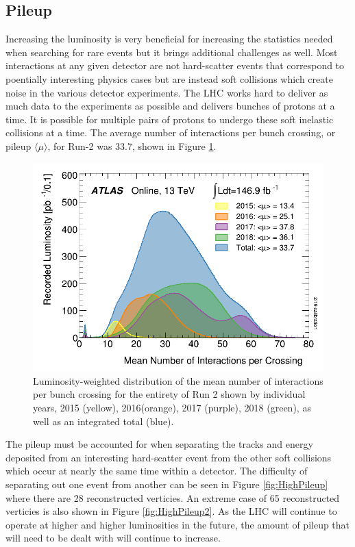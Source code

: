 \subsection{Pileup}

Increasing the luminosity is very beneficial for increasing the statistics needed when searching for rare events but it brings additional challenges as well.  Most interactions at any given detector are not hard-scatter events that correspond to poentially interesting physics cases but are instead soft collisions which create noise in the various detector experiments.  The LHC works hard to deliver as much data to the experiments as possible and delivers bunches of protons at a time.  It is possible for multiple pairs of protons to undergo these soft inelastic collisions at a time.  The average number of interactions per bunch crossing, or pileup $\langle{\mu}\rangle$, for Run-2 was 33.7, shown in Figure \ref{fig:ATLASmeanIntperCrossing}. 
\begin{figure}[h!]
	\centering
	\includegraphics[width=.7\columnwidth]{../ThesisImages/LHCImages/meanIntperCrossing.png}
	\caption[Luminosity-weighted distribution of the mean number of interactions per bunch crossing for the entirety of Run 2 shown by individual years, 2015 (yellow), 2016(orange), 2017 (purple), 2018 (green), as well as an integrated total (blue).]{Luminosity-weighted distribution of the mean number of interactions per bunch crossing for the entirety of Run 2 shown by individual years, 2015 (yellow), 2016(orange), 2017 (purple), 2018 (green), as well as an integrated total (blue).\cite{ATLASLumi}
	}
	\label{fig:ATLASmeanIntperCrossing}
\end{figure}
 The pileup must be accounted for when separating the tracks and energy deposited from an interesting hard-scatter event from the other soft collisions which occur at nearly the same time within a detector.  The difficulty of separating out one event from another can be seen in Figure \ref{fig:HighPileup} where there are 28 reconstructed verticies.  An extreme case of 65 reconstructed verticies is also shown in Figure \ref{fig:HighPileup2}.  As the LHC will continue to operate at higher and higher luminosities in the future, the amount of pileup that will need to be dealt with will continue to increase.  
